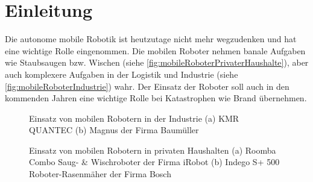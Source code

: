 \chapter{Einleitung}


Die autonome mobile Robotik ist heutzutage nicht mehr wegzudenken und hat eine wichtige Rolle eingenommen. Die mobilen Roboter nehmen banale Aufgaben wie Staubsaugen bzw. Wischen (siehe \autoref{fig:mobileRoboterPrivaterHaushalte}), aber auch komplexere Aufgaben in der Logistik und Industrie (siehe \autoref{fig:mobileRoboterIndustrie}) wahr. Der Einsatz der Roboter soll auch in den kommenden Jahren eine wichtige Rolle bei Katastrophen wie Brand übernehmen. \cite{Retungsroboter.2019} 

\begin{figure}[H]%
  \centering
  \qquad
  \caption{Einsatz von mobilen Robotern in der Industrie (a) KMR QUANTEC \cite{KUKA_Roboter.2016} (b) Magnus der Firma Baumüller \cite{Baumueller.2021}}
  \label{fig:mobileRoboterIndustrie}
\end{figure}

\begin{figure}[]
  \centering
  \qquad
  \caption{Einsatz von mobilen Robotern in privaten Haushalten (a) Roomba Combo Saug- \& Wischroboter der Firma iRobot \cite{iRobot.2021} (b) Indego S+ 500 Roboter-Rasenmäher der Firma Bosch \cite{Boschdiy.2021}}
  \label{fig:mobileRoboterPrivaterHaushalte}
\end{figure}

